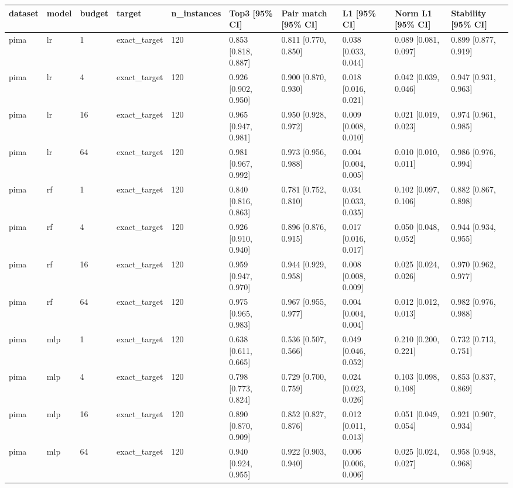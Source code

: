 \begin{tabular}{llllllllll}
\toprule
dataset & model & budget & target & n\_instances & Top3 [95\% CI] & Pair match [95\% CI] & L1 [95\% CI] & Norm L1 [95\% CI] & Stability [95\% CI] \\
\midrule
pima & lr & 1 & exact\_target & 120 & 0.853 [0.818, 0.887] & 0.811 [0.770, 0.850] & 0.038 [0.033, 0.044] & 0.089 [0.081, 0.097] & 0.899 [0.877, 0.919] \\
pima & lr & 4 & exact\_target & 120 & 0.926 [0.902, 0.950] & 0.900 [0.870, 0.930] & 0.018 [0.016, 0.021] & 0.042 [0.039, 0.046] & 0.947 [0.931, 0.963] \\
pima & lr & 16 & exact\_target & 120 & 0.965 [0.947, 0.981] & 0.950 [0.928, 0.972] & 0.009 [0.008, 0.010] & 0.021 [0.019, 0.023] & 0.974 [0.961, 0.985] \\
pima & lr & 64 & exact\_target & 120 & 0.981 [0.967, 0.992] & 0.973 [0.956, 0.988] & 0.004 [0.004, 0.005] & 0.010 [0.010, 0.011] & 0.986 [0.976, 0.994] \\
pima & rf & 1 & exact\_target & 120 & 0.840 [0.816, 0.863] & 0.781 [0.752, 0.810] & 0.034 [0.033, 0.035] & 0.102 [0.097, 0.106] & 0.882 [0.867, 0.898] \\
pima & rf & 4 & exact\_target & 120 & 0.926 [0.910, 0.940] & 0.896 [0.876, 0.915] & 0.017 [0.016, 0.017] & 0.050 [0.048, 0.052] & 0.944 [0.934, 0.955] \\
pima & rf & 16 & exact\_target & 120 & 0.959 [0.947, 0.970] & 0.944 [0.929, 0.958] & 0.008 [0.008, 0.009] & 0.025 [0.024, 0.026] & 0.970 [0.962, 0.977] \\
pima & rf & 64 & exact\_target & 120 & 0.975 [0.965, 0.983] & 0.967 [0.955, 0.977] & 0.004 [0.004, 0.004] & 0.012 [0.012, 0.013] & 0.982 [0.976, 0.988] \\
pima & mlp & 1 & exact\_target & 120 & 0.638 [0.611, 0.665] & 0.536 [0.507, 0.566] & 0.049 [0.046, 0.052] & 0.210 [0.200, 0.221] & 0.732 [0.713, 0.751] \\
pima & mlp & 4 & exact\_target & 120 & 0.798 [0.773, 0.824] & 0.729 [0.700, 0.759] & 0.024 [0.023, 0.026] & 0.103 [0.098, 0.108] & 0.853 [0.837, 0.869] \\
pima & mlp & 16 & exact\_target & 120 & 0.890 [0.870, 0.909] & 0.852 [0.827, 0.876] & 0.012 [0.011, 0.013] & 0.051 [0.049, 0.054] & 0.921 [0.907, 0.934] \\
pima & mlp & 64 & exact\_target & 120 & 0.940 [0.924, 0.955] & 0.922 [0.903, 0.940] & 0.006 [0.006, 0.006] & 0.025 [0.024, 0.027] & 0.958 [0.948, 0.968] \\

\end{tabular}
